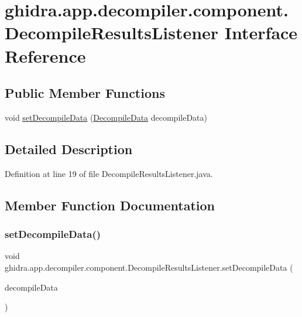\hypertarget{interfaceghidra_1_1app_1_1decompiler_1_1component_1_1_decompile_results_listener}{}\section{ghidra.\+app.\+decompiler.\+component.\+Decompile\+Results\+Listener Interface Reference}
\label{interfaceghidra_1_1app_1_1decompiler_1_1component_1_1_decompile_results_listener}
\subsection*{Public Member Functions}
\begin{DoxyCompactItemize}
\item 
void \mbox{\hyperlink{interfaceghidra_1_1app_1_1decompiler_1_1component_1_1_decompile_results_listener_ada564958a5298d18058646ae19b8259c}{set\+Decompile\+Data}} (\mbox{\hyperlink{classghidra_1_1app_1_1decompiler_1_1component_1_1_decompile_data}{Decompile\+Data}} decompile\+Data)
\end{DoxyCompactItemize}


\subsection{Detailed Description}


Definition at line 19 of file Decompile\+Results\+Listener.\+java.



\subsection{Member Function Documentation}
\mbox{\label{interfaceghidra_1_1app_1_1decompiler_1_1component_1_1_decompile_results_listener_ada564958a5298d18058646ae19b8259c}} 
\subsubsection{\texorpdfstring{setDecompileData()}{setDecompileData()}}
{\footnotesize\ttfamily void ghidra.\+app.\+decompiler.\+component.\+Decompile\+Results\+Listener.\+set\+Decompile\+Data (\begin{DoxyParamCaption}\item[{\mbox{\hyperlink{classghidra_1_1app_1_1decompiler_1_1component_1_1_decompile_data}{Decompile\+Data}}}]{decompile\+Data }\end{DoxyParamCaption})}



